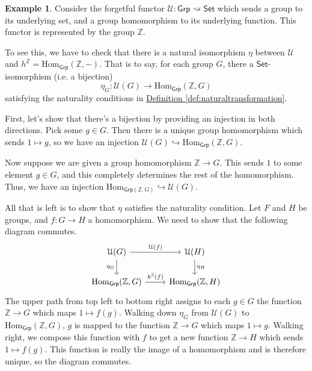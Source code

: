 \documentclass[a4paper,10pt]{scrreprt}
\newcommand{\Z}{\mathbb{Z}}
\newcommand{\Hom}{\mathrm{Hom}}
\theoremstyle{definition}
\newtheorem{example}{Example}[section]
\theoremstyle{plain}
\theoremstyle{remark}
\begin{document}
\begin{example}
  Consider the forgetful functor $\mathcal{U}\colon \mathsf{Grp} \rightsquigarrow \mathsf{Set}$ which sends a group to its underlying set, and a group homomorphism to its underlying function. This functor is represented by the group $\Z$.

  To see this, we have to check that there is a natural isomorphism $\eta$ between $\mathcal{U}$ and $h^{\Z} = \Hom_{\mathsf{Grp}}(\Z, -)$. That is to say, for each group $G$, there a $\mathsf{Set}$-isomorphism (i.e. a bijection)
  \begin{equation*}
    \eta_{G}\colon \mathcal{U}(G) \to \Hom_{\mathsf{Grp}}(\Z, G)
  \end{equation*}
  satisfying the naturality conditions in \hyperref[def:naturaltransformation]{Definition \ref*{def:naturaltransformation}}.

  First, let's show that there's a bijection by providing an injection in both directions. Pick some $g \in G$. Then there is a unique group homomorphism which sends $1 \mapsto g$, so we have an injection $\mathcal{U}(G) \hookrightarrow \Hom_{\mathsf{Grp}}(\Z, G)$.

  Now suppose we are given a group homomorphism $\Z \to G$. This sends $1$ to some element $g \in G$, and this completely determines the rest of the homomorphism. Thus, we have an injection $\Hom_{\mathsf{Grp}(\Z, G)} \hookrightarrow \mathcal{U}(G)$.

  All that is left is to show that $\eta$ satisfies the naturality condition. Let $F$ and $H$ be groups, and $f\colon G \to H$ a homomorphism. We need to show that the following diagram commutes.
  \begin{equation*}
    \begin{tikzcd}
      \mathcal{U}(G)
      \arrow[r, "\mathcal{U}(f)"]
      \arrow[d, swap, "\eta_{G}"]
      & \mathcal{U}(H)
      \arrow[d, "\eta_{H}"]
      \\
      \Hom_{\mathsf{Grp}}(\Z, G)
      \arrow[r, "h^{\Z}(f)"]
      & \Hom_{\mathsf{Grp}}(\Z, H)
    \end{tikzcd}
  \end{equation*}
  The upper path from top left to bottom right assigns to each $g \in G$ the function $\Z \to G$ which maps $1 \mapsto f(g)$. Walking down $\eta_{G}$ from $\mathcal{U}(G)$ to $\Hom_{\mathsf{Grp}}(\Z, G)$, $g$ is mapped to the function $\Z \to G$ which maps $1 \mapsto g$. Walking right, we compose this function with $f$ to get a new function $\Z \to H$ which sends $1 \mapsto f(g)$. This function is really the image of a homomorphism and is therefore unique, so the diagram commutes.
\end{example}
\end{document}

